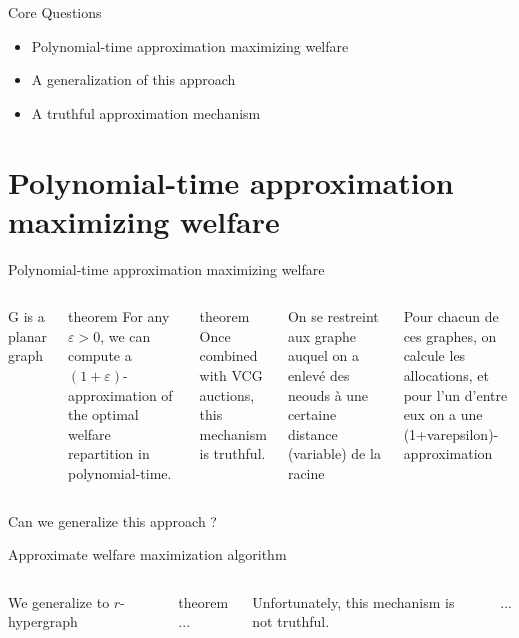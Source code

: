\documentclass[aspectratio=169]{beamer}
\begin{document}
\begin{frame}{Core Questions}
    \begin{itemize}
        \item Polynomial-time approximation maximizing welfare
        \item A generalization of this approach
        \item A truthful approximation mechanism
    \end{itemize}
\end{frame}

{\section{Polynomial-time approximation maximizing welfare}}

\begin{frame}{Polynomial-time approximation maximizing welfare}
    \begin{columns}
        G is a planar graph

        \begin{block}{theorem}
            For any $\varepsilon > 0$, we can compute a $(1 + \varepsilon)$-approximation of the optimal welfare repartition in polynomial-time.
        \end{block}

        \begin{block}{theorem}
            Once combined with VCG auctions, this mechanism is truthful.
        \end{block}

        On se restreint aux graphe auquel on a enlevé des neouds à une certaine distance (variable) de la racine

        Pour chacun de ces graphes, on calcule les allocations, et pour l'un d'entre eux on a une (1+varepsilon)-approximation


    \end{columns}
\end{frame}

\begin{frame}[standout]
    Can we generalize this approach ?
\end{frame}

\begin{frame}{Approximate welfare maximization algorithm}
    \begin{columns}
        We generalize to $r$-hypergraph

        \begin{block}{theorem}
            ...
        \end{block}

        Unfortunately, this mechanism is not truthful.

        ...
    \end{columns}
\end{frame}
\end{document}
